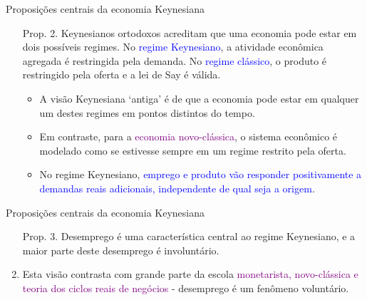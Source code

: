 \documentclass[10pt]{beamer}
\begin{document}
\begin{frame}{Proposições centrais da economia Keynesiana}
    \begin{enumerate}
        \item[Prop. 2.] Keynesianos ortodoxos acreditam que uma economia pode estar em dois possíveis regimes. No \textcolor{blue}{regime Keynesiano}, a atividade econômica agregada é restringida pela demanda. No \textcolor{blue}{regime clássico}, o produto é restringido pela oferta e a lei de Say é válida.
        \bigskip
        \begin{itemize}
            \item A visão Keynesiana `antiga' é de que a economia pode estar em qualquer um destes regimes em pontos distintos do tempo.
            \bigskip
            \item Em contraste, para a \textcolor{purple}{economia novo-clássica}, o sistema econômico é modelado como se estivesse sempre em um regime restrito pela oferta.
            \bigskip
            \item No regime Keynesiano, \textcolor{blue}{emprego e produto vão responder positivamente a demandas reais adicionais, independente de qual seja a origem}.
        \end{itemize}
    \end{enumerate}
\end{frame}

\begin{frame}{Proposições centrais da economia Keynesiana}
    \begin{enumerate}
        \item[Prop. 3.] Desemprego é uma característica central ao regime Keynesiano, e a maior parte deste desemprego é involuntário.
        \bigskip
        \item Esta visão contrasta com grande parte da escola \textcolor{purple}{monetarista, novo-clássica e teoria dos ciclos reais de negócios} - desemprego é um fenômeno voluntário.
    \end{enumerate}
\end{frame}
\end{document}
